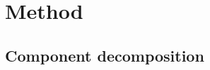 \documentclass[11pt]{article}
\begin{document}
%
%
%
%


\section{Method}
\label{sec:method}

\subsection{Component decomposition}
\label{sec:components}
%
%
%
\end{document}
